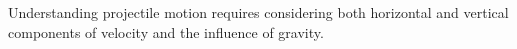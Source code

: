 \documentclass[preview]{standalone}
\begin{document}
\begin{center}
Understanding projectile motion requires considering both horizontal and vertical components of velocity and the influence of gravity.
\end{center}
\end{document}
